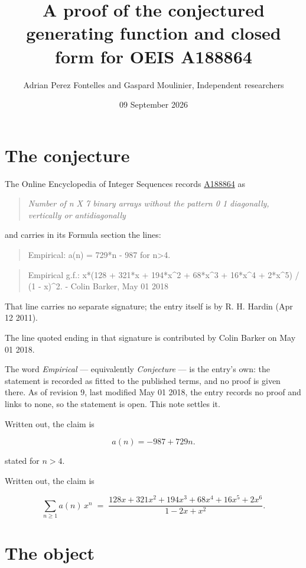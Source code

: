\documentclass[11pt]{article}
\title{A proof of the conjectured generating function and closed form for OEIS A188864}
\author{Adrian Perez Fontelles and Gaspard Moulinier, Independent researchers}
\date{09 September 2026}
\theoremstyle{definition}
\begin{document}
\maketitle
\section{The conjecture}

The Online Encyclopedia of Integer Sequences records \href{https://oeis.org/A188864}{A188864} as

\begin{quote}\itshape Number of n X 7 binary arrays without the pattern 0 1 diagonally, vertically or antidiagonally\end{quote}

and carries in its Formula section the lines:

\begin{quote}\ttfamily Empirical: a(n) = 729*n - 987 for n>4.\end{quote}

\begin{quote}\ttfamily Empirical g.f.: x*(128 + 321*x + 194*x\textasciicircum{}2 + 68*x\textasciicircum{}3 + 16*x\textasciicircum{}4 + 2*x\textasciicircum{}5) / (1 - x)\textasciicircum{}2. - Colin Barker, May 01 2018\end{quote}

That line carries no separate signature; the entry itself is by R. H. Hardin (Apr 12 2011).

The line quoted ending in that signature is contributed by Colin Barker on May 01 2018.

The word {\itshape Empirical} --- equivalently {\itshape Conjecture} --- is the entry's own: the statement is recorded as fitted to the published terms, and no proof is given there. As of revision 9, last modified May 01 2018, the entry records no proof and links to none, so the statement is open. This note settles it.

Written out, the claim is

\[a(n) = -987 + 729n.\]

stated for $n > 4$.

Written out, the claim is

\[\sum_{n \ge 1} a(n)\,x^n \;=\; \frac{128x + 321x^{2} + 194x^{3} + 68x^{4} + 16x^{5} + 2x^{6}}{1 - 2x + x^{2}}.\]

\section{The object}
\end{document}
